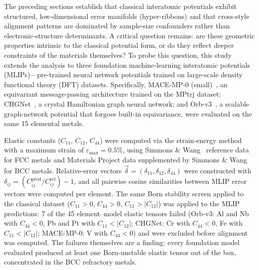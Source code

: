 \documentclass[twocolumn,9pt]{extarticle}
\begin{document}
The preceding sections establish that classical interatomic potentials exhibit structured, low-dimensional error manifolds (hyper-ribbons) and that cross-style alignment patterns are dominated by sample-size confounders rather than electronic-structure determinants. A critical question remains: are these geometric properties intrinsic to the classical potential form, or do they reflect deeper constraints of the materials themselves? To probe this question, this study extends the analysis to three foundation machine-learning interatomic potentials (MLIPs)---pre-trained neural network potentials trained on large-scale density functional theory (DFT) datasets. Specifically, MACE-MP-0 (small)~\cite{batatia2024}, an equivariant message-passing architecture trained on the MPtrj dataset; CHGNet~\cite{deng2023}, a crystal Hamiltonian graph neural network; and Orb-v3~\cite{rhodes2025}, a scalable graph-network potential that forgoes built-in equivariance, were evaluated on the same 15 elemental metals.

Elastic constants ($C_{11}$, $C_{12}$, $C_{44}$) were computed via the strain-energy method with a maximum strain of $\varepsilon_{\max} = 0.5\%$, using Simmons \& Wang~\cite{simmons1971} reference data for FCC metals and Materials Project data supplemented by Simmons \& Wang for BCC metals. Relative-error vectors $\vec{\delta} = (\delta_{11}, \delta_{12}, \delta_{44})$ were constructed with $\delta_{ij} = (C_{ij}^{\text{pred}} / C_{ij}^{\text{ref}}) - 1$, and all pairwise cosine similarities between MLIP error vectors were computed per element. The same Born stability screen applied to the classical dataset ($C_{11}>0$, $C_{44}>0$, $C_{11}>|C_{12}|$) was applied to the MLIP predictions: 7 of the 45 element--model elastic tensors failed (Orb-v3: Al and Nb with $C_{44}<0$, Pb and Pt with $C_{11}<|C_{12}|$; CHGNet: Cr with $C_{44}<0$, Fe with $C_{11}<|C_{12}|$; MACE-MP-0: V with $C_{44}<0$) and were excluded before alignment was computed. The failures themselves are a finding: every foundation model evaluated produced at least one Born-unstable elastic tensor out of the box, concentrated in the BCC refractory metals.
\end{document}
